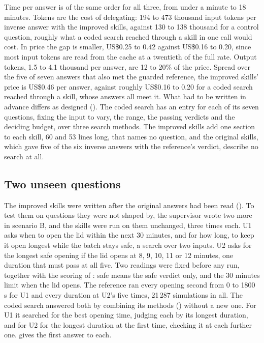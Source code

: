   Time per answer is of the same order for all three, from under a minute to 18
  minutes. Tokens are the cost of delegating: 194 to 473 thousand input tokens per inverse answer
  with the improved skills, against 130 to 138 thousand for a control question, roughly what a
  coded search reached through a skill in one call would cost. In price the gap is smaller, US\$0.25
  to 0.42 against US\$0.16 to 0.20, since most input tokens are read from the cache at a twentieth
  of the full rate. Output tokens, 1.5 to 4.1 thousand per answer, are 12 to 20\% of the price.
  Spread over the five of seven answers that also met the guarded reference, the improved skills'
  price is US\$0.46 per answer, against roughly US\$0.16 to 0.20 for a coded search reached through a
  skill, whose answers all meet it. What had
  to be written in advance differs as designed (). The coded search has an entry
  for each of its seven questions, fixing the input to vary, the range, the passing verdicts and
  the deciding budget, over three search methods. The improved skills add one section to each
  skill, 60 and 53 lines long, that names no question, and the original skills, which gave five of
  the six inverse answers with the reference's verdict, describe no search at all.

  \subsection{Two unseen questions}
  \label{sec:results-unseen}

  The improved skills were written after the original answers had been read ().
  To test them on questions they were not shaped by, the supervisor wrote two more in scenario B,
  and the skills were run on them unchanged, three times each. U1 asks when to open the lid within
  the next 30 minutes, and for how long, to keep it open longest while the batch stays safe, a
  search over two inputs. U2 asks for the longest safe opening if the lid opens at 8, 9, 10, 11 or
  12 minutes, one duration that must pass at all five. Two readings were fixed before any run,
  together with the scoring of : safe means the safe verdict only, and the
  30 minutes limit when the lid opens. The
  reference ran every opening second from 0 to 1800 s for U1 and every duration at U2's five
  times, 21\,287 simulations in all. The coded search answered both by combining its methods
  () without a new one. For U1 it searched for the best opening time, judging each by its longest
  duration, and for U2 for the longest duration at the first time, checking it at each further one.
   gives the first answer to each.

